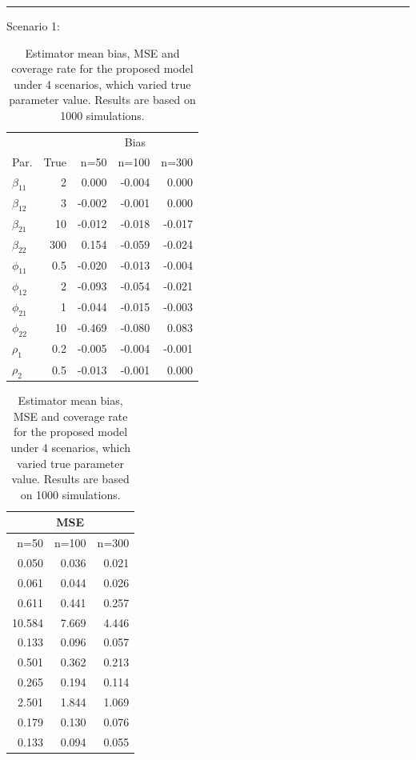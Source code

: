 \documentclass[useAMS,referee]{biom}
\begin{document}
\begin{table}[!h]
\caption{Estimator mean bias, MSE and coverage rate for the proposed model under 4
scenarios, which varied true parameter value. Results are based on 1000 simulations.}\hrule\vspace{0.2cm}
\small
Scenario 1:\\
\begin{minipage}[b]{0.43\textwidth}
\label{completa}
\begin{tabular}{lrrrr} 
	& &   \multicolumn{3}{c}{Bias}  \\ 
	\cmidrule{3-5}
	
	Par.	&  True & n=50 & n=100 & n=300   \\ 			\midrule 
	$\beta_{11}$ &	2&0.000
	&-0.004&	0.000\\
	$\beta_{12}$ &	3&-0.002
	&	-0.001&	0.000\\
	$\beta_{21}$&10& -0.012
	&	-0.018&	-0.017\\
	$\beta_{22}$&300&0.154
	&	-0.059&	-0.024\\
	$\phi_{11}$	&0.5& -0.020
	&	-0.013&	-0.004\\
	$\phi_{12}$&2&	-0.093
	&	-0.054&	-0.021\\
	$\phi_{21}$	&1&	-0.044
	&	-0.015&	-0.003\\
	$\phi_{22}$	&10&-0.469
	&-0.080&	0.083	\\
	$\rho_1$	&0.2&-0.005
	&-0.004&-0.001	\\
	$\rho_2$&	0.5	&-0.013
	&-0.001&	0.000\\
\end{tabular}
\end{minipage}
\begin{minipage}[b]{0.28\textwidth}
\begin{tabular}{rrr} 
	& \multicolumn{1}{c}{MSE}  &\\ 
	\midrule
	n=50 & n=100 & n=300   \\ 	
	\midrule 
	0.050&	0.036&	0.021\\
	0.061&	0.044&	0.026\\
	0.611&	0.441&	0.257\\
	10.584&	7.669&	4.446\\
	0.133&	0.096&	0.057\\
	0.501&	0.362&	0.213\\
	0.265&	0.194&	0.114\\
	2.501&	1.844&	1.069\\
	0.179&	0.130&	0.076\\
	0.133&	0.094&	0.055\\

\end{tabular}
\end{minipage}
\end{table}
\end{document}
